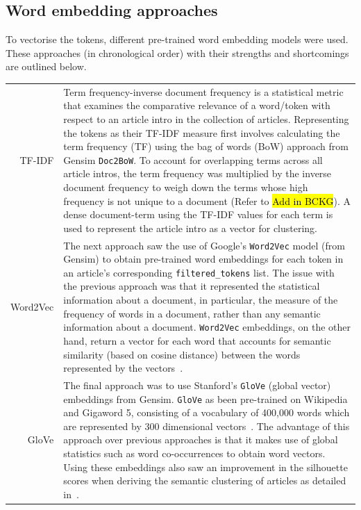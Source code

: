 \subsection{Word embedding approaches} \label{word_embed_approaches}
To vectorise the tokens, different pre-trained word embedding models were used. These approaches (in chronological order) with their strengths and shortcomings are outlined below.

\renewcommand\arraystretch{2}
\captionsetup{singlelinecheck=false, labelfont=sc, labelsep=quad}
\begin{longtable}{@{\,}r <{\hskip 2pt} !{\foo} >{\arraybackslash}p{14cm}}
\centering

TF-IDF & Term frequency-inverse document frequency is a statistical metric that examines the comparative relevance of a word/token with respect to an article intro in the collection of articles. Representing the tokens as their TF-IDF measure first involves calculating the term frequency (TF) using the bag of words (BoW) approach from Gensim \texttt{Doc2BoW}. To account for overlapping terms across all article intros, the term frequency was multiplied by the inverse document frequency to weigh down the terms whose high frequency is not unique to a document (Refer to  \hl{Add in BCKG}). A dense document-term using the TF-IDF values for each term is used to represent the article intro as a vector for clustering. \\

Word2Vec & The next approach saw the use of Google's \texttt{Word2Vec} model (from Gensim) to obtain pre-trained word embeddings for each token in an article's corresponding \texttt{filtered\_tokens} list. The issue with the previous approach was that it represented the statistical information about a document, in particular, the measure of the frequency of words in a document, rather than any semantic information about a document. \texttt{Word2Vec} embeddings, on the other hand, return a vector for each word that accounts for semantic similarity (based on cosine distance) between the words represented by the vectors~\cite{word2vec}. \\

GloVe & The final approach was to use Stanford's \texttt{GloVe} (global vector) embeddings from Gensim. \texttt{GloVe} as been pre-trained on Wikipedia and Gigaword 5, consisting of a vocabulary of 400,000 words which are represented by 300 dimensional vectors~\cite{glove}. The advantage of this approach over previous approaches is that it makes use of global statistics such as word co-occurrences to obtain word vectors. Using these embeddings also saw an improvement in the silhouette scores when deriving the semantic clustering of articles as detailed in~. \\
\end{longtable}

